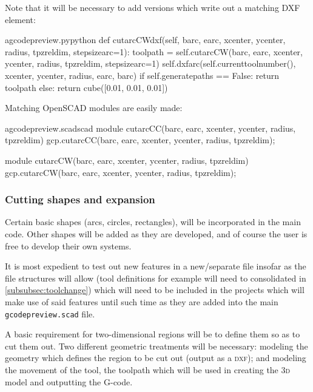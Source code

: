 \documentclass{ltxdoc}
\begin{document}
Note that it will be necessary to add versions which write out a matching DXF element:


\lstset{firstnumber=\thegcpy}
\begin{writecode}{a}{gcodepreview.py}{python}
    def cutarcCWdxf(self, barc, earc, xcenter, ycenter, radius, tpzreldim, stepsizearc=1):
        toolpath = self.cutarcCW(barc, earc, xcenter, ycenter, radius, tpzreldim, stepsizearc=1)
        self.dxfarc(self.currenttoolnumber(), xcenter, ycenter, radius, earc, barc)
        if self.generatepaths == False:
            return toolpath
        else:
            return cube([0.01, 0.01, 0.01])

\end{writecode}
\addtocounter{gcpy}{8}

Matching OpenSCAD modules are easily made:

\lstset{firstnumber=\thegcpscad}
\begin{writecode}{a}{gcodepreview.scad}{scad}
module cutarcCC(barc, earc, xcenter, ycenter, radius, tpzreldim){
    gcp.cutarcCC(barc, earc, xcenter, ycenter, radius, tpzreldim);
}

module cutarcCW(barc, earc, xcenter, ycenter, radius, tpzreldim){
    gcp.cutarcCW(barc, earc, xcenter, ycenter, radius, tpzreldim);
}

\end{writecode}
\addtocounter{gcpscad}{8}

\subsubsection{Cutting shapes and expansion}

Certain basic shapes (arcs, circles, rectangles), will be incorporated in the main code. Other shapes will be added as they are developed, and of course the user is free to develop their own systems.

 
It is most expedient to test out new features in a new/separate file insofar as the file structures will allow (tool definitions for example will need to consolidated in \ref{subsubsec:toolchange}) which will need to be included in the projects which will make use of said features until such time as they are added into the main \texttt{gcodepreview.scad} file.

A basic requirement for two-dimensional regions will be to define them so as to cut them out. Two different geometric treatments will be necessary: modeling the geometry which defines the region to be cut out (output as a \textsc{dxf}); and modeling the movement of the tool, the toolpath which will be used in creating the \textsc{3d} model and outputting the G-code.
\end{document}
